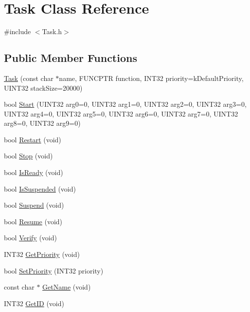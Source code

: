 \hypertarget{classTask}{\section{\-Task \-Class \-Reference}
\label{classTask}
}


{\ttfamily \#include $<$\-Task.\-h$>$}

\subsection*{\-Public \-Member \-Functions}
\begin{DoxyCompactItemize}
\item 
\hyperlink{classTask_afb7c8a69ecb923df1e787c46be887c8d}{\-Task} (const char $\ast$name, \-F\-U\-N\-C\-P\-T\-R function, \-I\-N\-T32 priority=k\-Default\-Priority, \-U\-I\-N\-T32 stack\-Size=20000)
\item 
bool \hyperlink{classTask_aed180b79ad986ff5e55170400db3c226}{\-Start} (\-U\-I\-N\-T32 arg0=0, \-U\-I\-N\-T32 arg1=0, \-U\-I\-N\-T32 arg2=0, \-U\-I\-N\-T32 arg3=0, \-U\-I\-N\-T32 arg4=0, \-U\-I\-N\-T32 arg5=0, \-U\-I\-N\-T32 arg6=0, \-U\-I\-N\-T32 arg7=0, \-U\-I\-N\-T32 arg8=0, \-U\-I\-N\-T32 arg9=0)
\item 
bool \hyperlink{classTask_a1c195fb41892ac1ca9bdf675d5fd3c95}{\-Restart} (void)
\item 
bool \hyperlink{classTask_a8249580436a83b7c1b089057a5f3d366}{\-Stop} (void)
\item 
bool \hyperlink{classTask_ac92d5d26e7ecc08b1f5a37a3e64ccaf9}{\-Is\-Ready} (void)
\item 
bool \hyperlink{classTask_afa3955c7ef2a5b3942c5952088d098fb}{\-Is\-Suspended} (void)
\item 
bool \hyperlink{classTask_aec1f9e1c674e60ea4591dfb0994dbd31}{\-Suspend} (void)
\item 
bool \hyperlink{classTask_aab1fd5134549786d499655e71a7f4ed9}{\-Resume} (void)
\item 
bool \hyperlink{classTask_a6a64ec6482de4ec6ae3975d8697d75aa}{\-Verify} (void)
\item 
\-I\-N\-T32 \hyperlink{classTask_a7b777da18a8fb73b3e1e50673e1bbf99}{\-Get\-Priority} (void)
\item 
bool \hyperlink{classTask_aab7f714e8bbe56738a377b551b65abea}{\-Set\-Priority} (\-I\-N\-T32 priority)
\item 
const char $\ast$ \hyperlink{classTask_ac7e3a400f969df83e247e71ac8f7666a}{\-Get\-Name} (void)
\item 
\-I\-N\-T32 \hyperlink{classTask_af89919e7be6e94717f17337c94de84f4}{\-Get\-I\-D} (void)
\end{DoxyCompactItemize}
